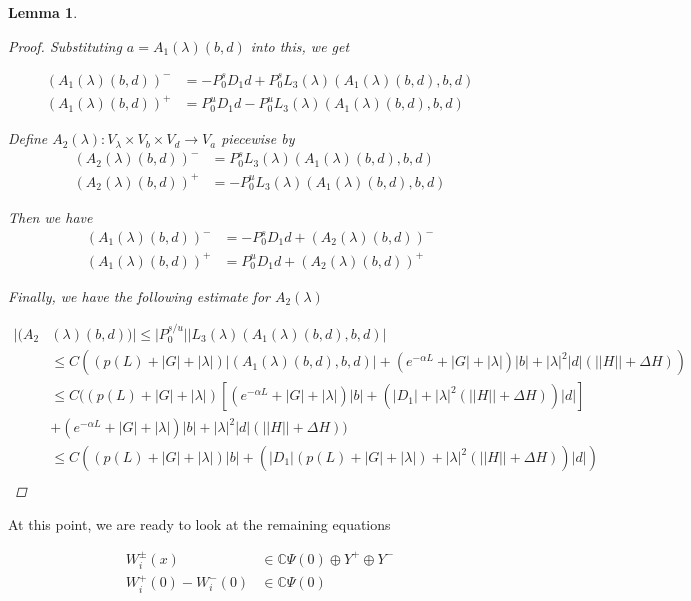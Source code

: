 \documentclass[12pt]{article}
\def\C{{\mathbb C}}
\newtheorem{lemma}{Lemma}
\begin{document}
\begin{lemma}
\begin{proof}
Substituting $a = A_1(\lambda)(b,d)$ into this, we get

\begin{align*}
(A_1(\lambda)(b,d))^- &= -P_0^s D_1 d + P_0^s L_3(\lambda)(A_1(\lambda)(b,d),b,d) \\
(A_1(\lambda)(b,d))^+ &= P_0^u D_1 d - P_0^u L_3(\lambda)(A_1(\lambda)(b,d),b,d)
\end{align*}

Define $A_2(\lambda): V_\lambda \times V_b \times V_d \rightarrow V_a$ piecewise by
\begin{align*}
(A_2(\lambda)(b,d))^- &= P_0^s L_3(\lambda)(A_1(\lambda)(b,d),b,d) \\
(A_2(\lambda)(b,d))^+ &= - P_0^u L_3(\lambda)(A_1(\lambda)(b,d),b,d)
\end{align*}

Then we have
\begin{align*}
(A_1(\lambda)(b,d))^- &= -P_0^s D_1 d + (A_2(\lambda)(b,d))^-\\
(A_1(\lambda)(b,d))^+ &= P_0^u D_1 d + (A_2(\lambda)(b,d))^+
\end{align*}

Finally, we have the following estimate for $A_2(\lambda)$

\begin{align*}
|(A_2&(\lambda)(b,d))| \leq |P_0^{s/u}|| L_3(\lambda)(A_1(\lambda)(b,d),b,d) |\\
&\leq C \left( (p(L) + |G| + |\lambda|)|(A_1(\lambda)(b,d),b,d)| + (e^{-\alpha L} + |G| + |\lambda|)|b| + |\lambda|^2|d|(||H|| + \Delta H ) \right) \\
&\leq C ( (p(L) + |G| + |\lambda|)[(e^{-\alpha L} + |G| + |\lambda|)|b| + (|D_1| + |\lambda|^2(||H|| + \Delta H ))|d| ] \\
&+ (e^{-\alpha L} + |G| + |\lambda|)|b| + |\lambda|^2|d|(||H|| + \Delta H ) ) \\
&\leq C( (p(L) + |G| + |\lambda|)|b| + (|D_1|(p(L) + |G| + |\lambda|) + |\lambda|^2(||H|| + \Delta H ))|d| ) \\
\end{align*}

\end{proof}
\end{lemma}

At this point, we are ready to look at the remaining equations

\begin{align*}
W_i^\pm(x) &\in \C \Psi(0) \oplus Y^+ \oplus Y^- \\
W_i^+(0) - W_i^-(0) &\in \C \Psi(0) 
\end{align*}
\end{document}
